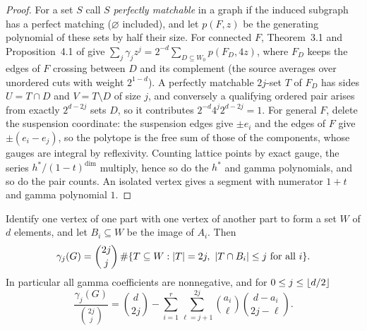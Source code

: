 
\begin{proof}
For a set $S$ call $S$ \emph{perfectly matchable} in a graph if the induced
subgraph has a perfect matching ($\varnothing$ included), and let $p(F,z)$
be the generating polynomial of these sets by half their size. For
connected $F$, Theorem~3.1 and Proposition~4.1 of
\cite{OhsugiTsuchiya2021Symmetric} give
$\sum_j\gamma_jz^j=2^{-d}\sum_{D\subseteq W_0}p(F_D,4z)$, where $F_D$ keeps the
edges of $F$ crossing between $D$ and its complement (the source averages
over unordered cuts with weight $2^{1-d}$). A perfectly matchable $2j$-set
$T$ of $F_D$ has sides $U=T\cap D$ and $V=T\setminus D$ of size $j$, and
conversely a qualifying ordered pair arises from exactly $2^{d-2j}$ sets $D$,
so it contributes $2^{-d}4^j2^{d-2j}=1$. For general $F$, delete the
suspension coordinate: the suspension edges give $\pm e_i$ and the edges of
$F$ give $\pm(e_i-e_j)$, so the polytope is the free sum of those of the
components, whose gauges are integral by reflexivity. Counting lattice
points by exact gauge, the series $h^*/(1-t)^{\dim}$ multiply, hence so do
the $h^*$ and gamma polynomials, and so do the pair counts. An isolated
vertex gives a segment with numerator $1+t$ and gamma polynomial $1$.
\end{proof}

\begin{theorem}\label{grw:thm:gamma}
Identify one vertex of one part with one vertex of another part to form a
set $W$ of $d$ elements, and let $B_i\subseteq W$ be the image of $A_i$.
Then
\begin{equation}\label{grw:eq:subsetgamma}
 \gamma_j(G)=\binom{2j}{j}\,
 \#\{T\subseteq W:\lvert T\rvert=2j,\ \lvert T\cap B_i\rvert\le j\text{ for all }i\}.
\end{equation}
In particular all gamma coefficients are nonnegative, and for
$0\le j\le\lfloor d/2\rfloor$
\begin{equation}\label{grw:eq:multigamma}
 \frac{\gamma_j(G)}{\binom{2j}{j}}=\binom d{2j}-\sum_{i=1}^r\sum_{\ell=j+1}^{2j}
 \binom{a_i}{\ell}\binom{d-a_i}{2j-\ell}.
\end{equation}
\end{theorem}

